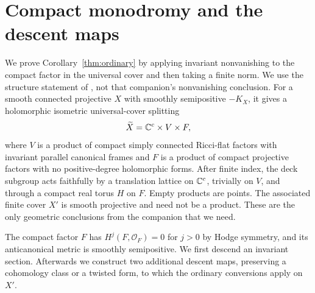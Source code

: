 \section{Compact monodromy and the descent maps}\label{sec:descent}\label{har:sec:descent}
We prove Corollary~\ref{thm:ordinary} by applying invariant
nonvanishing to the compact factor in the universal cover and then
taking a finite norm. We use the structure statement of \cite[Theorem \textnormal{(Finite cover with compact torus monodromy)}]{CompanionH}, not that companion's nonvanishing conclusion. For a smooth connected projective $X$ with smoothly semipositive $-K_X$, it gives a holomorphic isometric universal-cover splitting
\[
 \widetilde X=\mathbb C^c\times V\times F,
\]
where $V$ is a product of compact simply connected Ricci-flat factors with invariant parallel canonical frames and $F$ is a product of compact projective factors with no positive-degree holomorphic forms. After finite index, the deck subgroup acts faithfully by a translation lattice on $\mathbb C^c$, trivially on $V$, and through a compact real torus $H$ on $F$. Empty products are points. The associated finite cover $X'$ is smooth projective and need not be a product. These are the only geometric conclusions from the companion that we need.

The compact factor $F$ has $H^j(F,\mathcal O_F)=0$ for $j>0$ by
Hodge symmetry, and its anticanonical metric is smoothly semipositive.
We first descend an invariant section. Afterwards we construct two
additional descent maps, preserving a cohomology class or a twisted
form, to which the ordinary conversions apply on $X'$.

